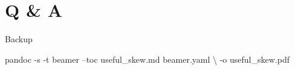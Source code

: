 \documentclass[10pt,ignorenonframetext,mathserif,onlymath]{beamer}
\newenvironment{Shaded}{}{}
\newcommand{\ExtensionTok}[1]{#1}
\newcommand{\NormalTok}[1]{#1}
\begin{document}
\begin{frame}

\end{frame}

\hypertarget{q-a}{%
\section{Q \& A}\label{q-a}}

\begin{frame}[fragile]{Backup}
\protect\hypertarget{backup}{}

\begin{Shaded}
\begin{Highlighting}[]
\ExtensionTok{pandoc}\NormalTok{ -s -t beamer --toc useful_skew.md beamer.yaml \textbackslash{}}
\NormalTok{       -o useful_skew.pdf}
\end{Highlighting}
\end{Shaded}

\end{frame}
\end{document}
